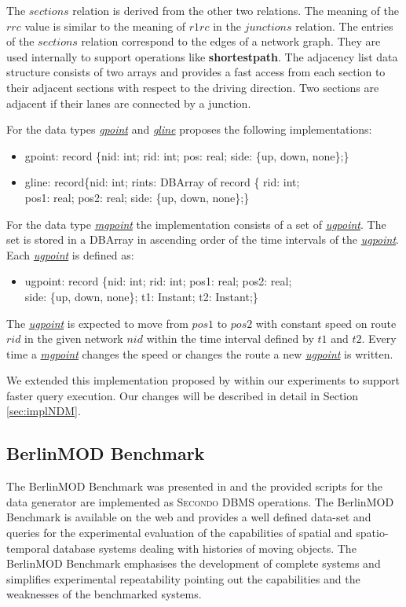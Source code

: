 \documentclass[a4paper]{article}
\newcommand{\secondo}{\textsc{Secondo}}
\newcommand{\bmodb} {BerlinMOD Benchmark}
\newcommand{\op}[1]{\textbf{#1}}
\newcommand{\dt}[1]{\textsl{\underline{#1}}}
\begin{document}
The $sections$ relation is derived from the other two relations. The meaning of
the $rrc$ value is similar to the meaning of $r1rc$ in the $junctions$ relation.
The entries of the $sections$ relation correspond to the edges of a network graph.
They are used internally to support operations like \op{shortestpath}. The adjacency
list data structure consists of two arrays and provides a fast
access from each section to their adjacent sections with respect to the driving
direction. Two sections are adjacent if their lanes are connected by a junction.

For the data types \dt{gpoint} and \dt{gline} \cite{NetworkGueting} proposes
the following implementations:
\begin{ttfamily}
\begin{itemize}
  \item [] gpoint: record \{nid: int; rid: int; pos: real; side: \{up, down, none\};\}
  \item [] gline: record\{nid: int; rints: DBArray of record \{ rid: int;\\
pos1: real; pos2: real; side: \{up, down, none\};\}
\end{itemize}
\end{ttfamily}
For the data type \dt{mgpoint} the implementation consists of a set of \dt{ugpoint}.
The set is stored in a DBArray in ascending order of the time intervals of the
\dt{ugpoint}. Each \dt{ugpoint} is defined as:
\begin{ttfamily}
\begin{itemize}
  \item [] ugpoint: record \{nid: int; rid: int; pos1: real; pos2: real;\\
side: \{up, down, none\}; t1: Instant; t2: Instant;\}
\end{itemize}
\end{ttfamily}
The \dt{ugpoint} is expected to move from $pos1$ to $pos2$ with constant speed on
route $rid$ in the given network $nid$ within the time interval defined by $t1$
and $t2$. Every time a \dt{mgpoint} changes the speed or changes the route a new
\dt{ugpoint} is written.

We extended this implementation proposed by \cite{NetworkGueting} within our
experiments to support faster query execution. Our changes will be described in
detail in Section \ref{sec:implNDM}.
\subsection{BerlinMOD Benchmark}
\label{sec:bmodb}
The \bmodb{} was presented in \cite{BerlinMODVLDBDuentgen} and the
provided scripts for the data generator are implemented as \secondo{} DBMS operations.
The \bmodb{} is available on the web \cite{berlinmodweb} and provides a well defined
data-set and queries for the experimental evaluation of the capabilities of
spatial and spatio-temporal database systems dealing with histories of moving
objects. The \bmodb{} emphasises the development of complete systems
and simplifies experimental repeatability pointing out the capabilities and the
weaknesses of the benchmarked systems.
\end{document}
